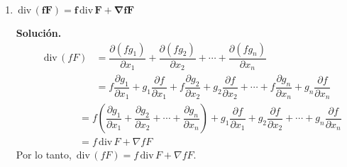 \documentclass[fleqn, 12pt]{article}
\newcommand{\derivadaparcial}[2]{\dfrac{\partial {#1}}{\partial {#2}}}
\newcommand{\rot}{\mathrm{\, rot \,}}
\newcommand{\dive}{\mathrm{\, div \,}}
\begin{document}
\begin{enumerate}
\begin{align*}
\begin{matrix}
                g_1 & g_3
            \end{matrix}
            \right\rvert \widehat{j} +
            \left\rvert 
            \begin{matrix}
                \derivadaparcial{}{x} & \derivadaparcial{}{y} \vspace{1mm} \\
                g_1 & g_2
            \end{matrix}
            \right\rvert \widehat{k} \\
            &= \left\lvert 
            \begin{matrix}
                \widehat{i} & \widehat{j} & \widehat{k} \vspace{1mm} \\
                \derivadaparcial{}{x} & \derivadaparcial{}{y} & \derivadaparcial{}{z} \vspace{1mm} \\
                f_1 & f_2 & f_3
            \end{matrix} \right\rvert + 
            \left\lvert 
            \begin{matrix}
                \widehat{i} & \widehat{j} & \widehat{k} \vspace{1mm} \\
                \derivadaparcial{}{x} & \derivadaparcial{}{y} & \derivadaparcial{}{z} \vspace{1mm} \\
                g_1 & g_2 & g_3
            \end{matrix}
            \right\rvert \\
            &= \rot F + \rot G
        \end{align*}
        Por lo tanto, $ \rot (F + G) = \rot F + \rot G $. \\

        \item $ \mathbf{\dive (fF) = f \dive F + \nabla f F} $
        
        \textbf{Solución.}
        \begin{align*}
            \dive (fF) &= \derivadaparcial{(f g_1)}{x_1} + \derivadaparcial{(f g_2)}{x_2} + \cdots + \derivadaparcial{(f g_n)}{x_n} \\
            &= f \derivadaparcial{g_1}{x_1} + g_1 \derivadaparcial{f}{x_1} + f \derivadaparcial{g_2}{x_2} + g_2 \derivadaparcial{f}{x_2} + \cdots + f \derivadaparcial{g_n}{x_n} + g_n \derivadaparcial{f}{x_n}
        \end{align*}
        \begin{align*}
            \qquad \qquad & = f \left( \derivadaparcial{g_1}{x_1} + \derivadaparcial{g_2}{x_2} + \cdots + \derivadaparcial{g_n}{x_n} \right) + g_1 \derivadaparcial{f}{x_1} + g_2 \derivadaparcial{f}{x_2} + \cdots + g_n \derivadaparcial{f}{x_n} \\
            &= f \dive F + \nabla f F
        \end{align*}
        Por lo tanto, $ \dive (fF) = f \dive F + \nabla f F $. \\


\end{enumerate}
\end{document}
